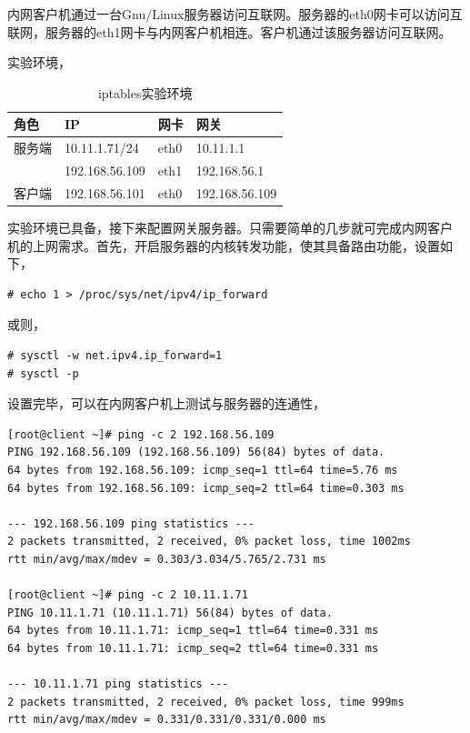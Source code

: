 内网客户机通过一台Gnu/Linux服务器访问互联网。服务器的eth0网卡可以访问互
联网，服务器的eth1网卡与内网客户机相连。客户机通过该服务器访问互联网。

实验环境，

\begin{table}[!htbp]
  \centering
  \caption{iptables实验环境}
  \label{tab:iptables_test}
  \begin{tabular}{llll}
    \toprule
    角色 & IP & 网卡 & 网关 \\
    \midrule
    服务端 & 10.11.1.71/24 & eth0 & 10.11.1.1 \\
           & 192.168.56.109 & eth1 & 192.168.56.1 \\
    客户端 & 192.168.56.101 & eth0 & 192.168.56.109 \\
    \bottomrule
  \end{tabular}
\end{table}

实验环境已具备，接下来配置网关服务器。只需要简单的几步就可完成内网客户
机的上网需求。首先，开启服务器的内核转发功能，使其具备路由功能，设置如
下，

\begin{verbatim}
# echo 1 > /proc/sys/net/ipv4/ip_forward
\end{verbatim}

或则，

\begin{verbatim}
# sysctl -w net.ipv4.ip_forward=1
# sysctl -p
\end{verbatim}

设置完毕，可以在内网客户机上测试与服务器的连通性，

\begin{verbatim}
[root@client ~]# ping -c 2 192.168.56.109
PING 192.168.56.109 (192.168.56.109) 56(84) bytes of data.
64 bytes from 192.168.56.109: icmp_seq=1 ttl=64 time=5.76 ms
64 bytes from 192.168.56.109: icmp_seq=2 ttl=64 time=0.303 ms

--- 192.168.56.109 ping statistics ---
2 packets transmitted, 2 received, 0% packet loss, time 1002ms
rtt min/avg/max/mdev = 0.303/3.034/5.765/2.731 ms

[root@client ~]# ping -c 2 10.11.1.71
PING 10.11.1.71 (10.11.1.71) 56(84) bytes of data.
64 bytes from 10.11.1.71: icmp_seq=1 ttl=64 time=0.331 ms
64 bytes from 10.11.1.71: icmp_seq=2 ttl=64 time=0.331 ms

--- 10.11.1.71 ping statistics ---
2 packets transmitted, 2 received, 0% packet loss, time 999ms
rtt min/avg/max/mdev = 0.331/0.331/0.331/0.000 ms
\end{verbatim}


